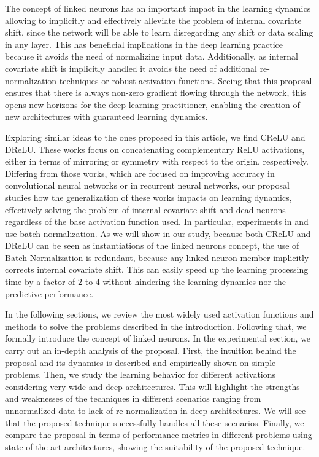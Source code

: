 \documentclass[10pt,twocolumn,letterpaper]{article}
\begin{document}
The concept of linked neurons has an important impact in the learning dynamics allowing to implicitly and effectively alleviate the problem of internal covariate shift, since the network will be able to learn disregarding any shift or data scaling in any layer. This has beneficial implications in the deep learning practice because it avoids the need of normalizing input data. Additionally, as internal covariate shift is implicitly handled it avoids the need of additional re-normalization techniques or robust activation functions. Seeing that this proposal ensures that there is always non-zero gradient flowing through the network, this opens new horizons for the deep learning practitioner, enabling the creation of new architectures with guaranteed learning dynamics.

Exploring similar ideas to the ones proposed in this article, we find CReLU\cite{crelu} and DReLU\cite{drelu}. These works focus on concatenating complementary ReLU activations, either in terms of mirroring or symmetry with respect to the origin, respectively. Differing from those works, which are focused on improving accuracy in convolutional neural networks or in recurrent neural networks, our proposal studies how the generalization of these works impacts on learning dynamics, effectively solving the problem of internal covariate shift and dead neurons regardless of the base activation function used. In particular, experiments in \cite{crelu} and \cite{drelu} use batch normalization. As we will show in our study, because both CReLU and DReLU can be seen as instantiations of the linked neurons concept, the use of Batch Normalization is redundant, because any linked neuron member implicitly corrects internal covariate shift. This can easily speed up the learning processing time by a factor of 2 to 4 without hindering the learning dynamics nor the predictive performance. 

In the following sections, we review the most widely used activation functions and methods to solve the problems described in the introduction. Following that, we formally introduce the concept of linked neurons. In the experimental section, we carry out an in-depth analysis of the proposal. First, the intuition behind the proposal and its dynamics is described and empirically shown on simple problems. Then, we study the learning behavior for different activations considering very wide and deep architectures. This will highlight the strengths and weaknesses of the techniques in different scenarios ranging from unnormalized data to lack of re-normalization in deep architectures. We will see that the proposed technique successfully handles all these scenarios. Finally, we compare the proposal in terms of performance metrics in different problems using state-of-the-art architectures, showing the suitability of the proposed technique.
\end{document}
